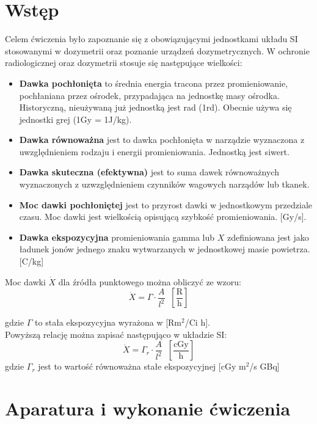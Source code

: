 \documentclass{article}
\begin{document}
\section{Wstęp}
Celem ćwiczenia było zapoznanie się z obowiązującymi jednostkami układu SI stosowanymi w dozymetrii oraz poznanie urządzeń dozymetrycznych. W ochronie radiologicznej oraz dozymetrii stosuje się następujące wielkości:
\begin{itemize}
	\item \textbf{Dawka pochłonięta} to średnia energia tracona przez promieniowanie, pochłaniana przez ośrodek, przypadająca na jednostkę masy ośrodka. Historyczną, nieużywaną już jednostką jest rad (1rd). Obecnie używa się jednostki grej (1Gy = 1J/kg).
	\item \textbf{Dawka równoważna} jest to dawka pochłonięta w narządzie wyznaczona z uwzględnieniem rodzaju i energii promieniowania. Jednostką jest siwert.
	\item \textbf{Dawka skuteczna (efektywna)} jest to suma dawek równoważnych wyznaczonych z uzwzględnieniem czynników wagowych narządów lub tkanek.
	\item \textbf{Moc dawki pochłoniętej} jest to przyrost dawki w jednostkowym przedziale czasu. Moc dawki jest wielkością opisującą szybkość promieniowania. [Gy/s].
	\item \textbf{Dawka ekspozycyjna} promieniowania gamma lub $X$ zdefiniowana jest jako ładunek jonów jednego znaku wytwarzanych w jednostkowej masie powietrza. [C/kg]
\end{itemize}

Moc dawki $\dot{X}$ dla źródła punktowego można obliczyć ze wzoru:
\begin{equation}
	\dot{X} = \Gamma\cdot \frac{A}{l^2} \;\;\left[\frac{\text{R}}{\text{h}}\right]
	\label{moc_rad}
\end{equation}

gdzie $\Gamma$ to stała ekspozycyjna wyrażona w [Rm$^2$/Ci h].\\
Powyższą relację można zapisać następująco w układzie SI:
\begin{equation}
	\dot{X} = \Gamma_r \cdot \frac{A}{l^2} \;\;\left[\frac{\text{cGy}}{\text{h}}\right]
	\label{moc}
\end{equation}
gdzie $\Gamma_r$ jest to wartość równoważna stałe ekspozycyjnej [cGy m$^2$/s GBq]


\section{Aparatura i wykonanie ćwiczenia}
\end{document}
